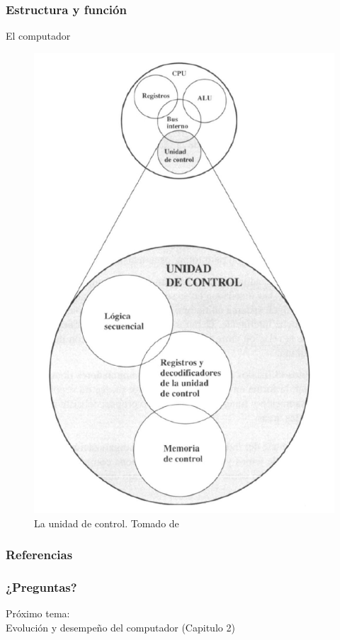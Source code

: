 \documentclass{beamer}
\begin{document}
	
	\begin{frame}
 		\frametitle{Estructura y función}
		\begin{block}{El computador}
\begin{figure}[H]
\centering
\includegraphics[scale=0.25]{imagenes/pc11.png}
\caption{La unidad de control. Tomado de \cite{stallings}}
\end{figure}
		\end{block}
	\end{frame}	

	
\begin{frame}[allowframebreaks]
  \frametitle{Referencias}
  
    
    
\end{frame}


\begin{frame}
	\frametitle{¿Preguntas?}
	\centering
	Próximo tema: \\Evolución y desempeño del computador (Capitulo 2)
\end{frame}					
			
\end{document}
